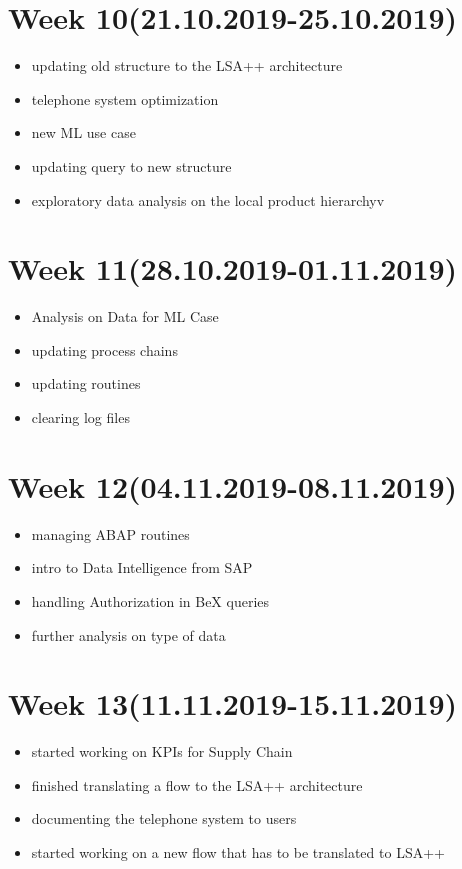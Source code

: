 \documentclass{article}
\begin{document}
	\section{Week 10(21.10.2019-25.10.2019)}
	\begin{itemize}
		\item updating old structure to the LSA++ architecture
		\item telephone system optimization
		\item new ML use case
		\item updating query to new structure
		\item exploratory data analysis on the local product hierarchyv
	\end{itemize}

	\section{Week 11(28.10.2019-01.11.2019)}
	\begin{itemize}
		\item Analysis on Data for ML Case
		\item updating process chains
		\item updating routines
		\item clearing log files
	\end{itemize}

	\section{Week 12(04.11.2019-08.11.2019)}
	\begin{itemize}
		\item managing ABAP routines
		\item intro to Data Intelligence from SAP
		\item handling Authorization in BeX queries
		\item further analysis on type of data
	\end{itemize}

	\section{Week 13(11.11.2019-15.11.2019)}
	\begin{itemize}
		\item started working on KPIs for Supply Chain
		\item finished translating a flow to the LSA++ architecture
		\item documenting the telephone system to users
		\item started working on a new flow that has to be translated to LSA++
	\end{itemize}
\end{document}
